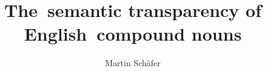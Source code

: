\author{Martin Schäfer}
\title{\mbox{The semantic} transparency of \mbox{English compound} nouns}
\subtitle{}
\renewcommand{\lsSeries}{mi}
\renewcommand{\lsSeriesNumber}{}
